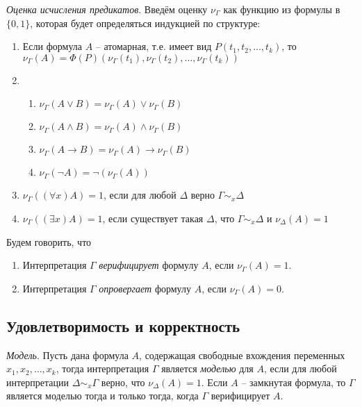 \begin{definition}
  \emph{Оценка исчисления предикатов}. Введём оценку $\nu_{\Gamma}$ как функцию из формулы в $\{0, 1\}$, которая будет определяться индукцией по структуре:
  \begin{enumerate}
  	\item Если формула $A$ -- атомарная, т.е. имеет вид $P(t_1, t_2, \ldots, t_k)$, то $\nu_{\Gamma}(A) = \Phi(P)(\nu_{\Gamma}(t_1), \nu_{\Gamma}(t_2), \ldots, \nu_{\Gamma}(t_k))$
  	\item \begin{enumerate}
    		\item $\nu_\Gamma(A \vee B) = \nu_\Gamma(A) \vee \nu_\Gamma(B)$
    		\item $\nu_\Gamma(A \wedge B) = \nu_\Gamma(A) \wedge \nu_\Gamma(B)$
    		\item $\nu_\Gamma(A \rightarrow B) = \nu_\Gamma(A) \rightarrow \nu_\Gamma(B)$
    		\item $\nu_\Gamma(\neg A) = \neg(\nu_\Gamma(A))$
    	  \end{enumerate}
    \item $\nu_\Gamma((\forall x)A) = 1$, если для любой $\Delta$ верно $\Gamma \sim_x \Delta$    	  \item $\nu_\Gamma((\exists x)A) = 1$, если существует такая $\Delta$, что $\Gamma \sim_x \Delta$ и $\nu_\Delta(A) = 1$
  \end{enumerate}
\end{definition}

Будем говорить, что 
\begin{enumerate}
	\item Интерпретация $\Gamma$ \textit{верифицирует} формулу $A$, если $\nu_{\Gamma}(A) = 1$.
	\item Интерпретация $\Gamma$ \textit{опровергает} формулу $A$, если $\nu_{\Gamma}(A) = 0$.
\end{enumerate}

\subsection{Удовлетворимость и корректность}

\begin{definition}
  \emph{Модель}. Пусть дана формула $A$, содержащая свободные вхождения переменных $x_1, x_2, \ldots, x_k$, тогда интерпретация $\Gamma$ является \textit{моделью} для $A$, если для любой интерпретации $\Delta \sim_x \Gamma$ верно, что $\nu_{\Delta}(A) = 1$. Если $A$ -- замкнутая формула, то $\Gamma$ является моделью тогда и только тогда, когда $\Gamma$ верифицирует $A$.
\end{definition}

